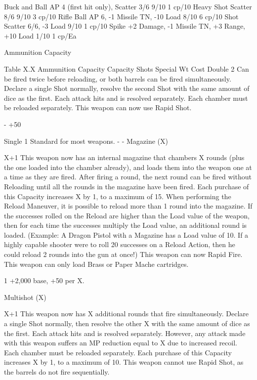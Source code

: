 \documentclass[oneside,11pt,english]{book}
\begin{document}
Buck and Ball AP 4 (first hit only), Scatter 3/6 9/10 1 cp/10 
Heavy Shot Scatter 8/6 9/10 3 cp/10 
Rifle Ball AP 6, -1 Missile TN, -10 Load 8/10 6 cp/10 
Shot Scatter 6/6, -3 Load 9/10 1 cp/10 
Spike +2 Damage, -1 Missile TN, +3 Range, +10 Load 1/10 1 cp/Ea 

 
Ammunition Capacity 

 
Table X.X Ammunition Capacity 
Capacity Shots Special Wt Cost 
Double 2 Can be fired twice before reloading, or both barrels can be fired simultaneously. 
Declare a single Shot normally, resolve the second Shot with the same amount of 
dice as the first. Each attack hits and is resolved separately. Each chamber must be 
reloaded separately. 
This weapon can now use Rapid Shot. 

- +50%

Single 1 Standard for most weapons. - - 
Magazine 
(X) 

X+1 This weapon now has an internal magazine that chambers X rounds (plus the one 
loaded into the chamber already), and loads them into the weapon one at a time as 
they are fired. 
After firing a round, the next round can be fired without Reloading until all the 
rounds in the magazine have been fired. Each purchase of this Capacity increases X 
by 1, to a maximum of 15. 
When performing the Reload Maneuver, it is possible to reload more than 1 round 
into the magazine. If the successes rolled on the Reload are higher than the Load 
value of the weapon, then for each time the successes multiply the Load value, an 
additional round is loaded. (Example: A Dragon Pistol with a Magazine has a Load 
value of 10. If a highly capable shooter were to roll 20 successes on a Reload 
Action, then he could reload 2 rounds into the gun at once!) 
This weapon can now Rapid Fire. 
This weapon can only load Brass or Paper Mache cartridges. 

 

1 +2,000%
base, +50%
per X. 

Multishot 
(X) 

X+1 This weapon now has X additional rounds that fire simultaneously. Declare a single 
Shot normally, then resolve the other X with the same amount of dice as the first. 
Each attack hits and is resolved separately. However, any attack made with this 
weapon suffers an MP reduction equal to X due to increased recoil. Each chamber 
must be reloaded separately. Each purchase of this Capacity increases X by 1, to a 
maximum of 10. 
This weapon cannot use Rapid Shot, as the barrels do not fire sequentially. 
\end{document}
